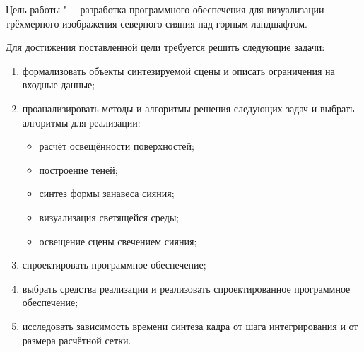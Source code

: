 

Цель работы "--- разработка программного обеспечения для визуализации трёхмерного изображения северного сияния над горным ландшафтом.

Для достижения поставленной цели требуется решить следующие задачи:
\begin{enumerate}
	\item формализовать объекты синтезируемой сцены и описать ограничения на входные данные;
	\item проанализировать методы и алгоритмы решения следующих задач и выбрать алгоритмы для реализации:
	\begin{itemize}
		\item расчёт освещённости поверхностей;
		\item построение теней;
		\item синтез формы занавеса сияния;
		\item визуализация светящейся среды;
		\item освещение сцены свечением сияния;
	\end{itemize}
	\item спроектировать программное обеспечение;
	\item выбрать средства реализации и реализовать спроектированное программное обеспечение;
	\item исследовать зависимость времени синтеза кадра от шага интегрирования и от размера расчётной сетки.
\end{enumerate}

